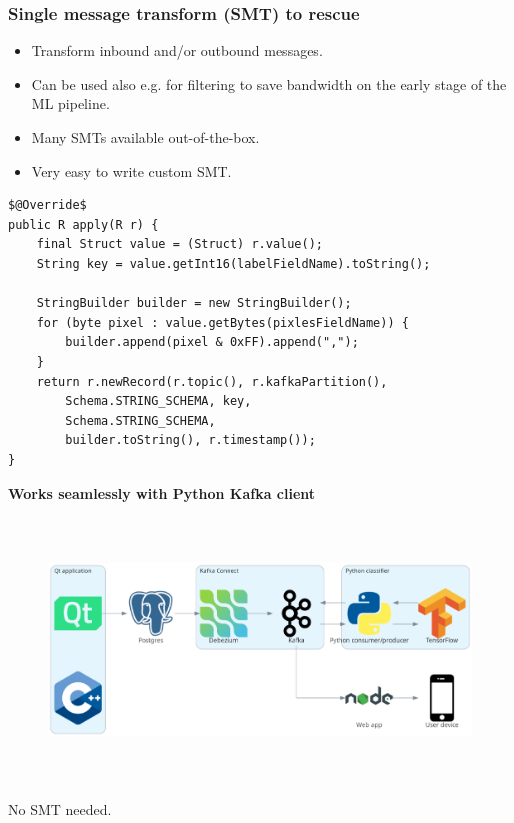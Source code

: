 \documentclass[10pt,utf8]{beamer}
\begin{document}
\begin{frame}[fragile]
    \frametitle{Single message transform (SMT) to rescue}
    \begin{itemize}
      \item Transform inbound and/or outbound messages.
      \item Can be used also e.g. for filtering to save bandwidth on the early stage of the ML pipeline.
      \item Many SMTs available out-of-the-box.
      \item Very easy to write custom SMT.
    \end{itemize}

    \vspace{0.5cm}
    
    \begin{lstlisting}[style=java]
$@Override$
public R apply(R r) {
    final Struct value = (Struct) r.value();
    String key = value.getInt16(labelFieldName).toString();

    StringBuilder builder = new StringBuilder();
    for (byte pixel : value.getBytes(pixlesFieldName)) {
        builder.append(pixel & 0xFF).append(",");
    }
    return r.newRecord(r.topic(), r.kafkaPartition(),
        Schema.STRING_SCHEMA, key,
        Schema.STRING_SCHEMA,
        builder.toString(), r.timestamp());
} 
     \end{lstlisting}
\end{frame}

\begin{frame}
    \vspace*{1cm}
    \centering
    \textbf{\huge{Works seamlessly with Python Kafka client}}
    
    \vspace*{-0.7cm}
    
    \begin{figure}
        \includegraphics[height=7cm]{./img/qt_to_node.eps}
    \end{figure}
    
    \vspace*{-2cm}
    
    No SMT needed.
\end{frame}
\end{document}
